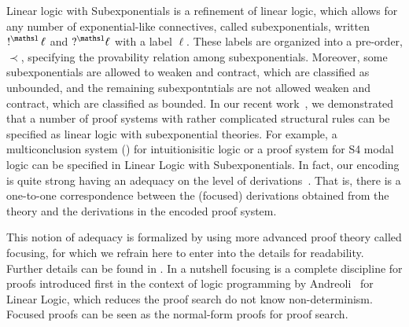 \documentclass[a4paper,10pt]{article}
\begin{document}
Linear logic with Subexponentials is a refinement of linear logic, which allows for any number of 
exponential-like connectives, called subexponentials, written $\nbang{\ell}$ and $\nquest{\ell}$ with a label $\ell$. These labels
 are organized into a pre-order, $\prec$, specifying the provability relation among subexponentials. Moreover, some subexponentials 
 are allowed to weaken and contract, which are classified as unbounded, and the remaining subexpontntials are not allowed 
 weaken and contract, which are classified as bounded. 
In our recent work~\cite{nigam.jlc}, we demonstrated
that a number of proof systems with rather complicated structural rules can be specified as linear logic with subexponential 
theories. For example, a multiconclusion system (\mLJ) for intuitionisitic logic or a proof system for S4 modal logic can be specified in 
Linear Logic with Subexponentials. 
In fact, our encoding is quite strong having an adequacy on the level of 
derivations~\cite{nigam10jar}. That is, there is a one-to-one correspondence between the (focused) derivations
obtained from the theory and the derivations in the encoded proof system. 

This notion of adequacy is formalized by using more advanced proof theory called focusing, for which we refrain here to 
enter into the details for readability. Further details can be found in \cite{nigam.jlc}. In a nutshell focusing
is a complete discipline for proofs introduced first in the context of logic programming 
by Andreoli~\cite{andreoli92jlc} for Linear 
Logic, which reduces the proof search do not know non-determinism. Focused proofs can be seen as the normal-form proofs for 
proof search. 
\end{document}
